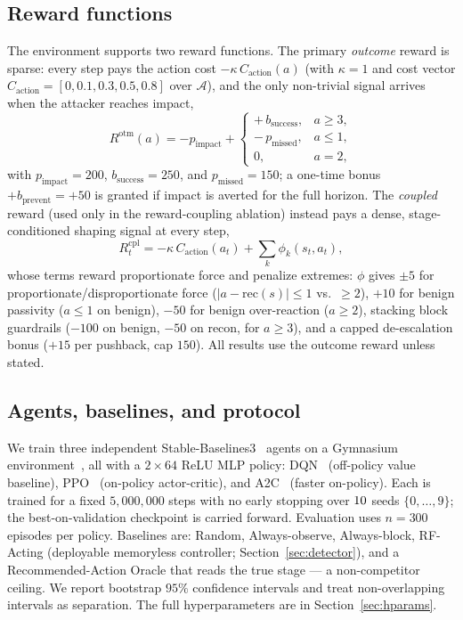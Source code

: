 \documentclass[3p,twocolumn]{elsarticle}
\begin{document}
\subsection{Reward functions}
\label{sec:reward}
The environment supports two reward functions. The primary \emph{outcome}
reward is sparse: every step pays the action cost
$-\kappa\,C_{\text{action}}(a)$ (with $\kappa=1$ and cost vector
$C_{\text{action}}=[0,0.1,0.3,0.5,0.8]$ over $\mathcal{A}$), and the only
non-trivial signal arrives when the attacker reaches impact,
\begin{equation}
R^{\mathrm{otm}}(a) = -p_{\text{impact}} +
\begin{cases}
+\,b_{\text{success}}, & a\ge3,\\
-\,p_{\text{missed}}, & a\le1,\\
0, & a=2,
\end{cases}
\label{eq:outcome}
\end{equation}
with $p_{\text{impact}}=200$, $b_{\text{success}}=250$, and
$p_{\text{missed}}=150$; a one-time bonus $+b_{\text{prevent}}=+50$ is granted
if impact is averted for the full horizon. The \emph{coupled} reward (used only
in the reward-coupling ablation) instead pays a dense, stage-conditioned shaping
signal at every step,
\begin{equation}
R^{\mathrm{cpl}}_t = -\kappa\,C_{\text{action}}(a_t)
+ \sum_{k}\phi_k(s_t,a_t),
\label{eq:coupled}
\end{equation}
whose terms reward proportionate force and penalize extremes: $\phi$ gives
$\pm5$ for proportionate/disproportionate force ($|a-\mathrm{rec}(s)|\!\le\!1$
vs.\ $\ge\!2$), $+10$ for benign passivity ($a\!\le\!1$ on benign), $-50$ for
benign over-reaction ($a\!\ge\!2$), stacking block guardrails ($-100$ on benign,
$-50$ on recon, for $a\!\ge\!3$), and a capped de-escalation bonus ($+15$ per
pushback, cap $150$). All results use the outcome reward unless stated.

\subsection{Agents, baselines, and protocol}
\label{sec:protocol}
We train three independent Stable-Baselines3~\cite{Raffin2021} agents on a
Gymnasium environment~\cite{Gymnasium2023}, all with a $2\times64$ ReLU MLP
policy: DQN~\cite{Mnih2015} (off-policy value baseline), PPO~\cite{Schulman2017}
(on-policy actor-critic), and A2C~\cite{Mnih2016} (faster on-policy). Each is
trained for a fixed $5{,}000{,}000$ steps with no early stopping over
$10$ seeds $\{0,\dots,9\}$; the best-on-validation checkpoint is carried
forward. Evaluation uses $n=300$ episodes per policy. Baselines are: Random,
Always-observe, Always-block, RF-Acting (deployable memoryless controller;
Section~\ref{sec:detector}), and a Recommended-Action Oracle that reads
the true stage --- a non-competitor ceiling. We report bootstrap $95\%$
confidence intervals and treat non-overlapping intervals as separation. The
full hyperparameters are in Section~\ref{sec:hparams}.
\end{document}
